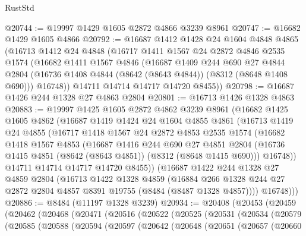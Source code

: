 \begin{lexlean}{RustStd}
\begin{coremodule}
@20744 := @19997 @1429 @1605 @2872 @4866 @3239 @8961
@20747 := @16682 @1429 @1605 @4866
@20792 := @16687
    @1412
    @1428
    @24
    @1604
    @4848
    @4865
    (@16713
      @1412
      @24
      @4848
      (@16717
        @1411
        @1567
        @24
        @2872
        @4846
        @2535
        @1574
        (@16682
          @1411
          @1567
          @4846
          (@16687
            @1409
            @244
            @690
            @27
            @4844
            @2804
            (@16736 @1408 @4844 (@8642 (@8643 @4844)) (@8312 (@8648 @1408 @690)))
            @16748))
        @14711
        @14714
        @14717
        @14720
        @8455))
@20798 := @16687 @1426 @244 @1328 @27 @4863 @2804
@20801 := @16713 @1426 @1328 @4863
@20883 := @19997
    @1425
    @1605
    @2872
    @4862
    @3239
    @8961
    (@16682
      @1425
      @1605
      @4862
      (@16687
        @1419
        @1424
        @24
        @1604
        @4855
        @4861
        (@16713
          @1419
          @24
          @4855
          (@16717
            @1418
            @1567
            @24
            @2872
            @4853
            @2535
            @1574
            (@16682
              @1418
              @1567
              @4853
              (@16687
                @1416
                @244
                @690
                @27
                @4851
                @2804
                (@16736 @1415 @4851 (@8642 (@8643 @4851)) (@8312 (@8648 @1415 @690)))
                @16748))
            @14711
            @14714
            @14717
            @14720
            @8455))
        (@16687
          @1422
          @244
          @1328
          @27
          @4859
          @2804
          (@16713
            @1422
            @1328
            @4859
            (@16884 @266 @1328 @244 @27 @2872 @2804 @4857 @8391 @19755 (@8484 (@8487 @1328 @4857))))
          @16748)))
@20886 := @8484 (@11197 @1328 @3239)
@20934 := @20408
    (@20453
      (@20459
        (@20462
          (@20468
            (@20471
              (@20516
                (@20522
                  (@20525
                    (@20531
                      (@20534
                        (@20579
                          (@20585
                            (@20588
                              (@20594
                                (@20597
                                  (@20642
                                    (@20648
                                      (@20651
                                        (@20657
                                          (@20660

\end{coremodule}
\end{lexlean}
